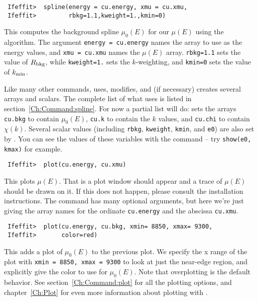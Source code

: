 \begin{verbatim}
 Ifeffit>  spline(energy = cu.energy, xmu = cu.xmu, 
 Ifeffit>         rbkg=1.1,kweight=1.,kmin=0)
\end{verbatim}
\noindent
This computes the background spline $\mu_0(E)$ for our $\mu(E)$ using the
{\autobk} algorithm.  The argument {\tt{energy = cu.energy}} names the
array to use as the energy values, and {\tt{xmu = cu.xmu}} names the
$\mu(E)$ array.  {\tt{rbkg=1.1}} sets the value of $R_{\rm bkg}$, while
{\tt{kweight=1.}} sets the $k$-weighting, and {\tt{kmin=0}} sets the value
of $k_{\rm min}$.

Like many other commands, {} uses, modifies, and (if necessary)
creates several arrays and scalars.  The complete list of what
{} uses is listed in section~{\ref{Ch:Command:spline}}.  For now a
partial list will do: {} sets the arrays {\tt{cu.bkg}} to
contain $\mu_0(E)$, {\tt{cu.k}} to contain the $k$ values, and
{\tt{cu.chi}} to contain $\chi(k)$.  Several scalar values (including
{\tt{rbkg}}, {\tt{kweight}}, {\tt{kmin}}, and {\tt{e0}}) are also set by
{}.  You can see the values of these variables with the
{} command -- try {\tt{show(e0, kmax)}} for example.

\begin{verbatim}
 Ifeffit>  plot(cu.energy, cu.xmu)
\end{verbatim}
\noindent
This plots $\mu(E)$.  That is a plot window should appear and a trace of
$\mu(E)$ should be drawn on it.  If this does not happen, please consult
the installation instructions.  The {} command has many optional
arguments, but here we're just giving the array names for the ordinate
{\tt{cu.energy}} and the abscissa {\tt{cu.xmu}}.


\begin{verbatim}
 Ifeffit>  plot(cu.energy, cu.bkg, xmin= 8850, xmax= 9300, 
 Ifeffit>       color=red)
\end{verbatim}
\noindent
This adds a plot of $\mu_0(E)$ to the previous plot.  
We specify the x range of the
plot with {\tt{xmin = 8850, xmax = 9300}} to look at just the near-edge
region, and explicitly give the color to use for $\mu_0(E)$.  Note that
overplotting is the default behavior.  See section~{\ref{Ch:Command:plot}} for
all the plotting options, and chapter~{\ref{Ch:Plot}} for even more
information about plotting with {\ifeffit}.


